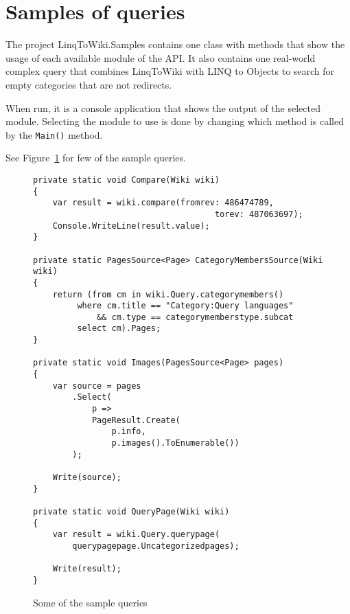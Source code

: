 \section{Samples of queries}
\label{ltw-s}

The project LinqToWiki.Samples contains one class with methods
that show the usage of each available module of the \ac{API}.
It also contains one real-world complex query that combines LinqToWiki with LINQ to Objects
to search for empty categories that are not redirects.

When run, it is a console application that shows the output of the selected module.
Selecting the module to use is done by changing which method is called by the \lstinline{Main()} method.

See Figure~\ref{query-samples} for few of the sample queries.

\begin{figure}[htbp]

\begin{lstlisting}
private static void Compare(Wiki wiki)
{
	var result = wiki.compare(fromrev: 486474789,
                                     torev: 487063697);
	Console.WriteLine(result.value);
}

private static PagesSource<Page> CategoryMembersSource(Wiki wiki)
{
	return (from cm in wiki.Query.categorymembers()
		 where cm.title == "Category:Query languages"
		     && cm.type == categorymemberstype.subcat
		 select cm).Pages;
}

private static void Images(PagesSource<Page> pages)
{
	var source = pages
		.Select(
			p =>
			PageResult.Create(
				p.info,
				p.images().ToEnumerable())
		);

	Write(source);
}

private static void QueryPage(Wiki wiki)
{
	var result = wiki.Query.querypage(
		querypagepage.Uncategorizedpages);

	Write(result);
}        
\end{lstlisting}

\caption{Some of the sample queries}
\label{query-samples}
\end{figure}